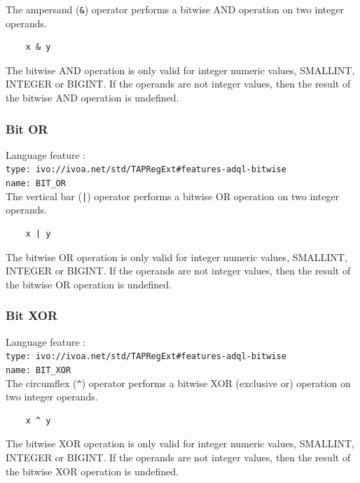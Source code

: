 \documentclass[11pt,a4paper]{ivoa}
\begin{document}
The ampersand (\verb:&:) operator performs a bitwise AND operation
on two integer operands.

\begin{verbatim}
    x & y
\end{verbatim}

The bitwise AND operation is only valid for integer numeric values,
SMALLINT, INTEGER or BIGINT.
If the operands are not integer values, then the result of the bitwise
AND operation is undefined.

\subsubsection{Bit OR}
\label{sec:bitwise.or}
{\footnotesize Language feature :}\\
{\footnotesize \verb|type: ivo://ivoa.net/std/TAPRegExt#features-adql-bitwise|}\\
{\footnotesize \verb|name: BIT_OR|}\\

The vertical bar (\verb:|:) operator performs a bitwise OR operation
on two integer operands.

\begin{verbatim}
    x | y
\end{verbatim}

The bitwise OR operation is only valid for integer numeric values, 
SMALLINT, INTEGER or BIGINT.
If the operands are not integer values, then the result of the bitwise OR
operation is undefined.

\subsubsection{Bit XOR}
\label{sec:bitwise.xor}
{\footnotesize Language feature :}\\
{\footnotesize \verb|type: ivo://ivoa.net/std/TAPRegExt#features-adql-bitwise|}\\
{\footnotesize \verb|name: BIT_XOR|}\\

The circumflex (\verb:^:) operator performs a bitwise XOR (exclusive or)
operation on two integer operands.

\begin{verbatim}
    x ^ y
\end{verbatim}

The bitwise XOR operation is only valid for integer numeric values, 
SMALLINT, INTEGER or BIGINT.
If the operands are not integer values, then the result of the bitwise
XOR operation is undefined.
\end{document}

